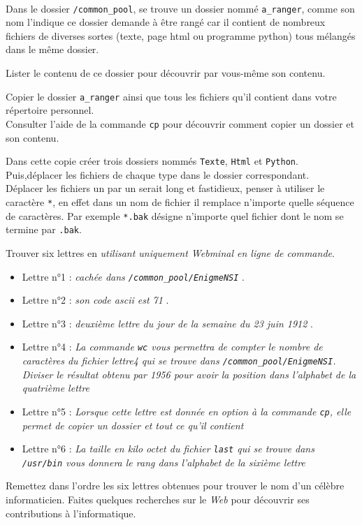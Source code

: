 \documentclass[11pt,a4paper]{article}
\begin{document}
\\
Dans le dossier \texttt{/common\_pool}, se trouve un dossier nommé \texttt{a\_ranger}, comme son nom l'indique ce dossier demande à être rangé car il contient de nombreux fichiers de diverses sortes (texte, page html ou programme python) tous mélangés dans le même dossier.
\QListe
\item Lister le contenu de ce dossier pour découvrir par vous-même son contenu.
\item Copier le dossier \texttt{a\_ranger} ainsi que tous les fichiers qu'il contient dans votre répertoire personnel.\\
\aide \; Consulter l'aide de la commande \texttt{cp} pour découvrir comment copier un dossier et son contenu.
\item Dans cette copie créer trois dossiers nommés \texttt{Texte}, \texttt{Html} et \texttt{Python}. Puis,déplacer les fichiers de chaque type dans le dossier correspondant. \\
\aide \; Déplacer les fichiers un par un serait long et fastidieux, penser à utiliser le caractère  \texttt{*}, en effet dans un nom de fichier il remplace n'importe quelle séquence de caractères. Par exemple \texttt{*.bak} désigne n'importe quel fichier dont le nom se termine par \texttt{.bak}.
\FinListe
\vspace{0.1cm}


\QListe
\item Trouver  six lettres  en \textit{utilisant uniquement Webminal en ligne de commande}.
\begin{itemize}
	\item Lettre n°1 : \og \textit{cachée dans \texttt{/common\_pool/EnigmeNSI}} \fg.
	\item Lettre n°2 : \og \textit{son code {\sc ascii} est 71} \fg.
	\item Lettre n°3 : \og \textit{deuxième lettre du jour de la semaine du 23 juin 1912} \fg.
	\item Lettre n°4 : \og \textit{La commande \texttt{wc} vous permettra de compter le nombre de caractères du fichier lettre4 qui se trouve dans \texttt{/common\_pool/EnigmeNSI}. Diviser le résultat obtenu par 1956 pour avoir la position dans l'alphabet de la quatrième lettre}
	\item Lettre n°5 : \og \textit{Lorsque cette lettre est donnée en option à la commande \texttt{cp}, elle permet de copier un dossier et tout ce qu'il contient }\fg
	\item Lettre n°6 : \og \textit{La taille en kilo octet du fichier \texttt{last} qui se trouve dans \texttt{/usr/bin} vous donnera le rang dans l'alphabet de la sixième lettre}
\end{itemize}
\item Remettez dans l'ordre les six lettres obtenues pour trouver le nom d'un célèbre informaticien. Faites quelques recherches sur le \textit{Web} pour découvrir ses contributions à l'informatique.
\FinListe
\end{document}
